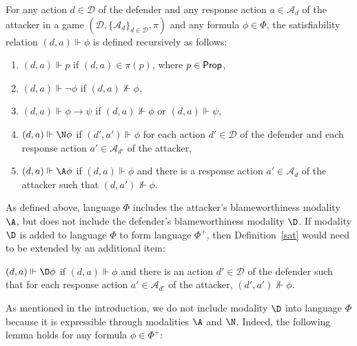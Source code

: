\documentclass[letterpaper]{article}
\begin{document}
\begin{definition}\label{sat} 
For any action $d\in\mathcal{D}$ of the defender and any response action $a\in\mathcal{A}_d$ of the attacker in a game $(\mathcal{D},\{\mathcal{A}_d\}_{d\in\mathcal{D}},\pi)$ and any formula $\phi\in\Phi$, the satisfiability relation $(d,a)\Vdash\phi$ is defined recursively as follows:
\begin{enumerate}
    \item $(d,a)\Vdash p$ if $(d,a)\in \pi(p)$, where $p\in {\sf Prop}$,
    \item $(d,a)\Vdash \neg\phi$ if $(d,a)\nVdash \phi$,
    \item $(d,a)\Vdash\phi\to\psi$ if $(d,a)\nVdash\phi$ or $(d,a)\Vdash\psi$,
    \item $(d,a)\Vdash\N\phi$ if $(d',a')\Vdash\phi$ for each action $d'\in\mathcal{D}$ of the defender and each response action $a'\in\mathcal{A}_{d'}$ of the attacker,
    \item $(d,a)\Vdash\A\phi$ if $(d,a)\Vdash\phi$ and there is a response action $a'\in\mathcal{A}_d$ of the attacker such that  $(d,a')\nVdash\phi$.
\end{enumerate}
\end{definition}

As defined above, language $\Phi$ includes the attacker's blameworthiness modality $\A$, but does not include the defender's blameworthiness modality $\D$. If modality $\D$ is added to language $\Phi$ to form language $\Phi^+$, then Definition~\ref{sat} would need to be extended by an additional item:
\begin{enumerate}
{\em 
  \setcounter{enumi}{5}
  \item $(d,a)\Vdash\D\phi$ if $(d,a)\Vdash\phi$ and there is an action $d'\in\mathcal{D}$ of the defender such that for each response action $a'\in \mathcal{A}_{d'}$ of the attacker, $(d',a')\nVdash\phi$.}
\end{enumerate}
As mentioned in the introduction, we do not include modality $\D$ into language $\Phi$ because it is expressible through modalities $\A$ and $\N$. Indeed, the following lemma holds for any formula $\phi\in\Phi^+$: 
\end{document}
